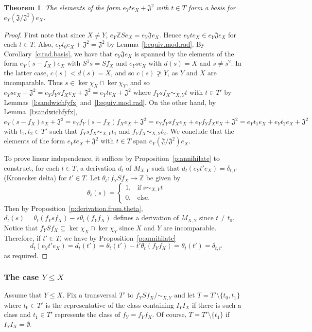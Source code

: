 \documentclass[reqno,11pt]{amsart}
\newtheorem{Thm}{Theorem}[section]
\numberwithin{equation}{section}
\begin{document}
\begin{Thm}
    The elements of the form $e_Yte_X +\mathfrak J^2$ with $t\in T$ form a basis for $e_Y(\mathfrak J/\mathfrak J^2)e_X$.
\end{Thm}
\begin{proof}
    First note that since $X\neq Y$, $e_Y\mathbb ZSe_X=e_Y\mathfrak Je_X$.  Hence $e_Yte_X\in e_Y\mathfrak Je_X$ for each $t\in T$.   Also, $e_Yt_0e_X+\mathfrak J^2=\mathfrak J^2$ by Lemma~\ref{l:equiv.mod.rad}.  By Corollary~\ref{c:rad.basis}, we have that $e_Y\mathfrak Je_X$ is spanned by the elements of the form $e_Y(s-f_X)e_X$ with $S^1s=Sf_X$ and $e_Yse_X$ with $d(s)=X$ and $s\neq s^2$.   In the latter case, $c(s)< d(s)=X$, and so $c(s)\ngeq Y$, as $Y$ and $X$ are incomparable.  Thus $s\in \ker\chi_X\cap \ker \chi_Y$, and so $e_Yse_X+\mathfrak J^2 = e_Yf_Ysf_Xe_X+\mathfrak J^2 = e_Yte_X+\mathfrak J^2$ where $f_Ysf_X\sim_{X,Y} t$ with $t\in T'$ by Lemmas~\ref{l:sandwichfyfx} and~\ref{l:equiv.mod.rad}.    On the other hand, by Lemma~\ref{l:sandwichfyfx}, $e_Y(s-f_X)e_X+\mathfrak J^2 = e_Yf_Y(s-f_X)f_Xe_X+\mathfrak J^2 = e_Yf_Ysf_Xe_X+e_Yf_Yf_Xe_X+\mathfrak J^2 = e_Yt_1e_X+e_Yt_2e_X+\mathfrak J^2$ with $t_1,t_2\in T'$ such that $f_Ysf_X\sim_{X,Y} t_1$ and $f_Yf_X\sim_{X,Y} t_2$.  We conclude that the elements of the form $e_Yte_X+\mathfrak J^2$ with $t\in T$ span $e_Y(\mathfrak J/\mathfrak J^2)e_X$.

    To prove linear independence, it suffices by Proposition~\ref{p:annihilate} to construct, for each $t\in T$, a derivation $d_t$ of $M_{X,Y}$ such that $d_t(e_Yt'e_X) = \delta_{t,t'}$ (Kronecker delta) for $t'\in T$.   Let $\theta_t\colon f_YSf_X\to \mathbb Z$ be given by 
    \[\theta_t(s) = \begin{cases}
        1, & \text{if}\ s\sim_{X,Y} t\\ 0, & \text{else.}
    \end{cases}\]
    Then by Proposition~\ref{p:derivation.from.theta}, $d_t(s) = \theta_t(f_Ysf_X) - s\theta_t(f_Yf_X)$ defines a derivation of $M_{X,Y}$ since $t\neq t_0$.   Notice that $f_YSf_X\subseteq \ker \chi_X\cap \ker \chi_Y$ since $X$ and $Y$ are incomparable.  Therefore, if $t'\in T$, we have by Proposition~\ref{p:annihilate} 
    \[d_t(e_Yt'e_X) = d_t(t') = \theta_t(t') - t'\theta_t(f_Yf_X)=\theta_t(t') = \delta_{t,t'}\] as required. 
\end{proof}

\subsubsection{The case $Y\leq X$}  Assume that $Y\leq X$.
Fix a transversal $T'$ to $f_YSf_X/{\sim_{X,Y}}$ and let $T=T'\setminus \{t_0,t_1\}$ where $t_0\in T'$ is the representative of the class containing $I_YI_X$ if there is such a class and $t_1\in T'$ represents the class of $f_Y =f_Yf_X$. Of course, $T=T'\setminus \{t_1\}$ if $I_YI_X=\emptyset$.
\end{document}
